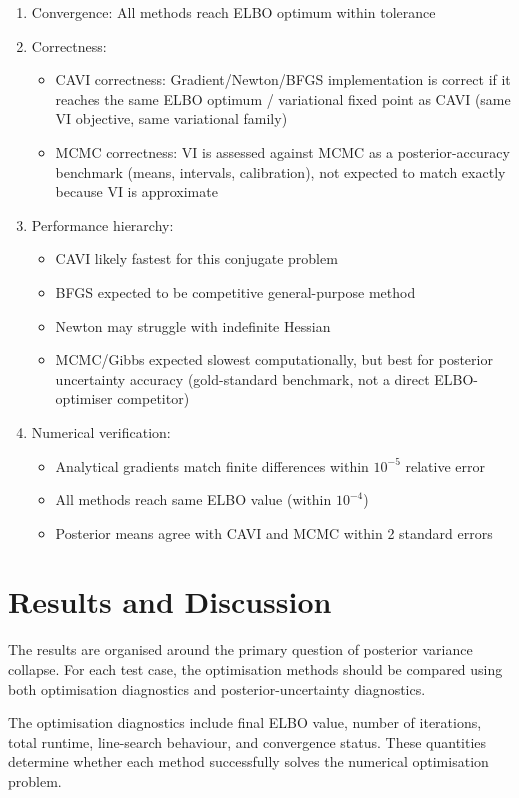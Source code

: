 \documentclass[11pt,a4paper]{article}
\begin{document}
\begin{enumerate}
\item Convergence: All methods reach ELBO optimum within tolerance
\item Correctness:
\begin{itemize}
\item CAVI correctness: Gradient/Newton/BFGS implementation is correct if it reaches the same ELBO optimum / variational fixed point as CAVI (same VI objective, same variational family)
\item MCMC correctness: VI is assessed against MCMC as a posterior-accuracy benchmark (means, intervals, calibration), not expected to match exactly because VI is approximate
\end{itemize}
\item Performance hierarchy:
\begin{itemize} 
\item CAVI likely fastest for this conjugate problem
\item BFGS expected to be competitive general-purpose method
\item Newton may struggle with indefinite Hessian
\item MCMC/Gibbs expected slowest computationally, but best for posterior uncertainty accuracy (gold-standard benchmark, not a direct ELBO-optimiser competitor)
\end{itemize}
\item Numerical verification:
\begin{itemize}
\item Analytical gradients match finite differences within $10^{-5}$ relative error
\item All methods reach same ELBO value (within $10^{-4}$)
\item Posterior means agree with CAVI and MCMC within 2 standard errors
\end{itemize}
\end{enumerate}
 

\section{Results and Discussion}

The results are organised around the primary question of posterior variance collapse. For each test case, the optimisation methods should be compared using both optimisation diagnostics and posterior-uncertainty diagnostics.

The optimisation diagnostics include final ELBO value, number of iterations, total runtime, line-search behaviour, and convergence status. These quantities determine whether each method successfully solves the numerical optimisation problem.
\end{document}
